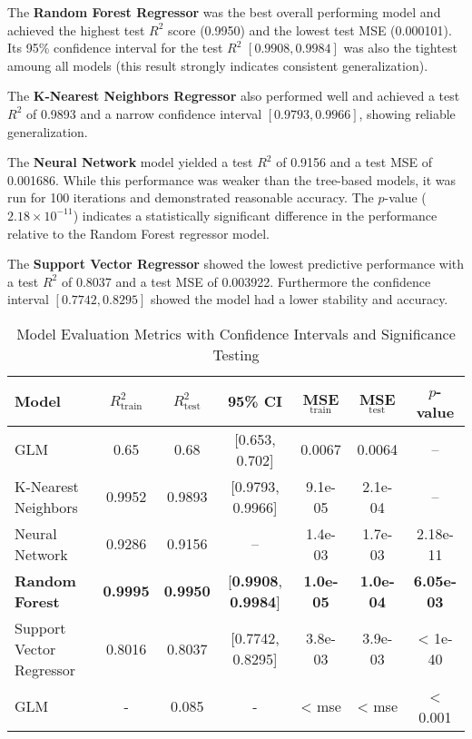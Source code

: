 The \textbf{Random Forest Regressor} was the best overall performing model and achieved the highest test $R^2$ score (0.9950) and the lowest test MSE (0.000101). Its 95\% confidence interval for the test $R^2$ \([0.9908, 0.9984]\) was also the tightest amoung all models (this result strongly indicates consistent generalization).

The \textbf{K-Nearest Neighbors Regressor} also performed well and achieved a test $R^2$ of 0.9893 and a narrow confidence interval \([0.9793, 0.9966]\), showing reliable generalization. 

The \textbf{Neural Network} model yielded a test $R^2$ of 0.9156 and a test MSE of 0.001686. While this performance was weaker than the tree-based models, it was run for 100 iterations and demonstrated reasonable accuracy. The $p$-value ($2.18 \times 10^{-11}$) indicates a statistically significant difference in the performance relative to the  Random Forest regressor model.

The \textbf{Support Vector Regressor} showed the lowest predictive performance with a test $R^2$ of 0.8037 and a test MSE of 0.003922. Furthermore the confidence interval \([0.7742, 0.8295]\) showed the model had a lower stability and accuracy.

\begin{table}[h!]
\centering
\caption{Model Evaluation Metrics with Confidence Intervals and Significance Testing}
\label{tab:model_results}
\begin{tabular}{lcccccc}
\toprule
\textbf{Model} & $R^2_{\text{train}}$ & $R^2_{\text{test}}$ & 95\% CI & MSE$_{\text{train}}$ & MSE$_{\text{test}}$ & $p$-value \\
\midrule
GLM & 0.65 & 0.68 & [0.653, 0.702] & 0.0067 &  0.0064 & -- \\
K-Nearest Neighbors & 0.9952 & 0.9893 & [0.9793, 0.9966] & 9.1e-05 & 2.1e-04 & -- \\
Neural Network & 0.9286 & 0.9156 & -- & 1.4e-03 & 1.7e-03 & 2.18e-11 \\
\textbf{Random Forest} & \textbf{0.9995} & \textbf{0.9950} & [\textbf{0.9908}, \textbf{0.9984}] & \textbf{1.0e-05} & \textbf{1.0e-04} & \textbf{6.05e-03} \\
Support Vector Regressor & 0.8016 & 0.8037 & [0.7742, 0.8295] & 3.8e-03 & 3.9e-03 & < 1e-40 \\
GLM & - & 0.085 & - & < mse & < mse & < 0.001 \\
\bottomrule
\end{tabular}
\end{table}

